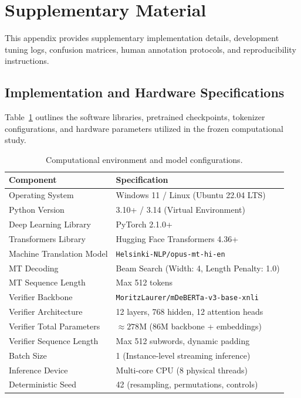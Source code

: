 \appendix
\section{Supplementary Material}
\label{sec:supplementary}

This appendix provides supplementary implementation details, development tuning logs, confusion matrices, human annotation protocols, and reproducibility instructions.

\subsection{Implementation and Hardware Specifications}
\label{sec:app_hardware}
Table~\ref{tab:app_specs} outlines the software libraries, pretrained checkpoints, tokenizer configurations, and hardware parameters utilized in the frozen computational study.

\begin{table}[t]
\centering
\small
\begin{tabular}{ll}
\toprule
\textbf{Component} & \textbf{Specification} \\
\midrule
Operating System & Windows 11 / Linux (Ubuntu 22.04 LTS) \\
Python Version & 3.10+ / 3.14 (Virtual Environment) \\
Deep Learning Library & PyTorch 2.1.0+ \\
Transformers Library & Hugging Face Transformers 4.36+ \\
Machine Translation Model & \texttt{Helsinki-NLP/opus-mt-hi-en} \\
MT Decoding & Beam Search (Width: 4, Length Penalty: 1.0) \\
MT Sequence Length & Max 512 tokens \\
Verifier Backbone & \texttt{MoritzLaurer/mDeBERTa-v3-base-xnli} \\
Verifier Architecture & 12 layers, 768 hidden, 12 attention heads \\
Verifier Total Parameters & $\approx 278$M (86M backbone + embeddings) \\
Verifier Sequence Length & Max 512 subwords, dynamic padding \\
Batch Size & 1 (Instance-level streaming inference) \\
Inference Device & Multi-core CPU (8 physical threads) \\
Deterministic Seed & 42 (resampling, permutations, controls) \\
\bottomrule
\end{tabular}
\caption{Computational environment and model configurations.}
\label{tab:app_specs}
\end{table}

